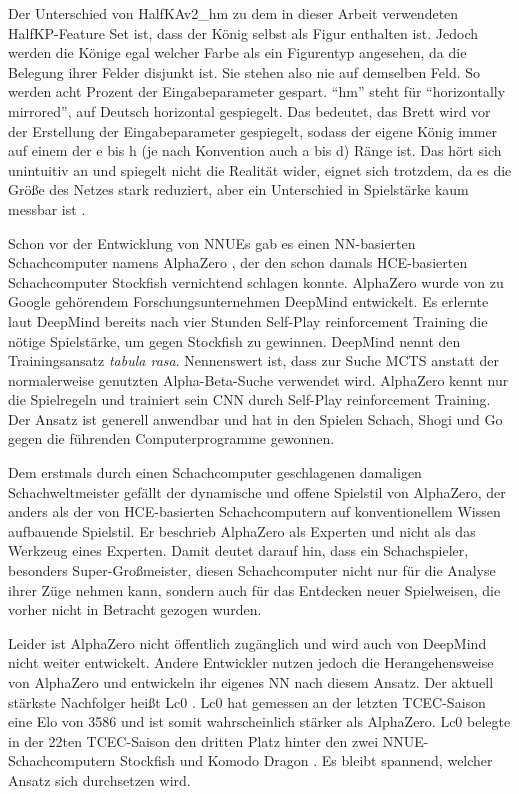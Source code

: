 Der Unterschied von HalfKAv2\_hm zu dem in dieser Arbeit verwendeten HalfKP-Feature Set ist, dass der König selbst als Figur enthalten ist. Jedoch werden die Könige egal welcher Farbe als ein Figurentyp angesehen, da die Belegung ihrer Felder disjunkt ist. Sie stehen also nie auf demselben Feld. So werden acht Prozent der Eingabeparameter gespart. \enquote{hm} steht für \enquote{horizontally mirrored}, auf Deutsch horizontal gespiegelt. Das bedeutet, das Brett wird vor der Erstellung der Eingabeparameter gespiegelt, sodass der eigene König immer auf einem der e bis h (je nach Konvention auch a bis d) Ränge ist. Das hört sich unintuitiv an und spiegelt nicht die Realität wider, eignet sich trotzdem, da es die Größe des Netzes stark reduziert, aber ein Unterschied in Spielstärke kaum messbar ist \cite{StockfishNNUE}.

Schon vor der Entwicklung von \acp{NNUE} gab es einen \ac{NN}-basierten Schachcomputer namens AlphaZero \cite{Silver2017}, der den schon damals \ac{HCE}-basierten Schachcomputer Stockfish vernichtend schlagen konnte. AlphaZero wurde \citeyear{Silver2017} von zu Google gehörendem Forschungsunternehmen DeepMind entwickelt. Es erlernte laut DeepMind bereits nach vier Stunden Self-Play reinforcement Training die nötige Spielstärke, um gegen Stockfish zu gewinnen. DeepMind nennt den Trainingsansatz \emph{tabula rasa}. Nennenswert ist, dass zur Suche \ac{MCTS} anstatt der normalerweise genutzten Alpha-Beta-Suche verwendet wird. AlphaZero kennt nur die Spielregeln und trainiert sein \ac{CNN} durch Self-Play reinforcement Training. Der Ansatz ist generell anwendbar und hat in den Spielen Schach, Shogi und Go gegen die führenden Computerprogramme gewonnen.

Dem erstmals durch einen Schachcomputer geschlagenen damaligen Schachweltmeister \citeauthor{Kasparov2018} \cite{Kasparov2018} gefällt der dynamische und offene Spielstil von AlphaZero, der anders als der von \ac{HCE}-basierten Schachcomputern auf konventionellem Wissen aufbauende Spielstil. Er beschrieb AlphaZero als Experten und nicht als das Werkzeug eines Experten. Damit deutet \citeauthor{Kasparov2018} darauf hin, dass ein Schachspieler, besonders Super-Großmeister, diesen Schachcomputer nicht nur für die Analyse ihrer Züge nehmen kann, sondern auch für das Entdecken neuer Spielweisen, die vorher nicht in Betracht gezogen wurden.

Leider ist AlphaZero nicht öffentlich zugänglich und wird auch von DeepMind nicht weiter entwickelt. Andere Entwickler nutzen jedoch die Herangehensweise von AlphaZero und entwickeln ihr eigenes \ac{NN} nach diesem Ansatz. Der aktuell stärkste Nachfolger heißt \ac{Lc0} \cite{Lc0Homepage}. \ac{Lc0} hat gemessen an der letzten \ac{TCEC}-Saison eine Elo von 3586 \cite{TCEC22} und ist somit wahrscheinlich stärker als AlphaZero. \ac{Lc0} belegte in der 22ten \ac{TCEC}-Saison den dritten Platz hinter den zwei \ac{NNUE}-Schachcomputern Stockfish und Komodo Dragon \cite{KomodoDragon}. Es bleibt spannend, welcher Ansatz sich durchsetzen wird.